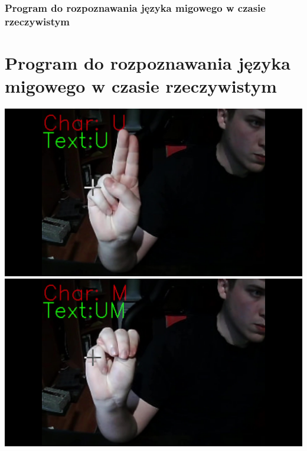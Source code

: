 \documentclass{beamer}
\begin{document}
	\begin{frame}
		\frametitle{Program do rozpoznawania języka migowego w czasie rzeczywistym}
		\section{Program do rozpoznawania języka migowego w czasie rzeczywistym}
		\begin{center}
			\includegraphics[scale=0.07]{U}
			\includegraphics[scale=0.07]{M}
			

\end{center}
\end{frame}
\end{document}
